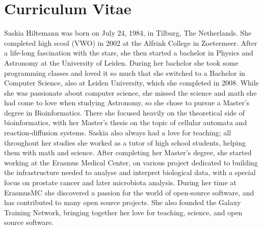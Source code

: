 \chapter{Curriculum Vitae}
\label{AppendixB}

Saskia Hiltemann was born on July 24, 1984, in Tilburg, The Netherlands. She completed high scool (VWO) in 2002 at the Alfrink College in Zoetermeer. After a life-long fascination with the stars, she then started a bachelor in Physics and Astronomy at the University of Leiden. During her bachelor she took some programming classes and loved it so much that she switched to a Bachelor in Computer Science, also at Leiden University, which she completed in 2008. While she was passionate about computer science, she missed the science and math she had come to love when studying Astronomy, so she chose to pursue a Master's degree in Bioinformatics. There she focused heavily on the theoretical side of bioinformatics, with her Master's thesis on the topic of cellular automata and reaction-diffusion systems. Saskia also always had a love for teaching; all throughout her studies she worked as a tutor of high school students, helping them with math and science. After completing her Master's degree, she started working at the Erasmus Medical Center, on various project dedicated to building the infrastructure needed to analyse and interpret biological data, with a special focus on prostate cancer and later microbiota analysis. During her time at ErasmusMC she discovered a passion for the world of open-source software, and has contributed to many open source projects. She also founded the Galaxy Training Network, bringing together her love for teaching, science, and open source software.
